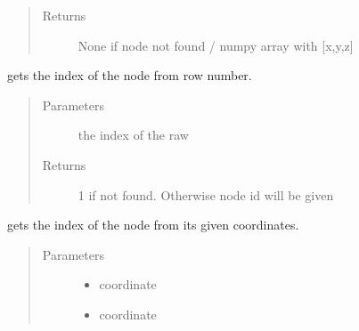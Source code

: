 \documentclass[letterpaper,10pt,english]{sphinxmanual}
\begin{document}
\begin{fulllineitems}
\begin{fulllineitems}
\begin{quote}
\begin{description}
\item[{Returns}] \leavevmode
None if node not found / numpy array with {[}x,y,z{]}

\end{description}\end{quote}

\end{fulllineitems}


\begin{fulllineitems}
\label{\detokenize{api:beamon.database.Database.get_node_id}}
gets the index of the node from row number.
\begin{quote}\begin{description}
\item[{Parameters}] \leavevmode
{} \textendash{} the index of the raw

\item[{Returns}] \leavevmode
\sphinxhyphen{}1 if not found. Otherwise node id will be given

\end{description}\end{quote}

\end{fulllineitems}


\begin{fulllineitems}
\label{\detokenize{api:beamon.database.Database.get_node_index}}
gets the index of the node from its given coordinates.
\begin{quote}\begin{description}
\item[{Parameters}] \leavevmode\begin{itemize}
\item {} 
 \textendash{} coordinate

\item {} 
 \textendash{} coordinate


\end{itemize}
\end{description}
\end{quote}
\end{fulllineitems}
\end{fulllineitems}
\end{document}
